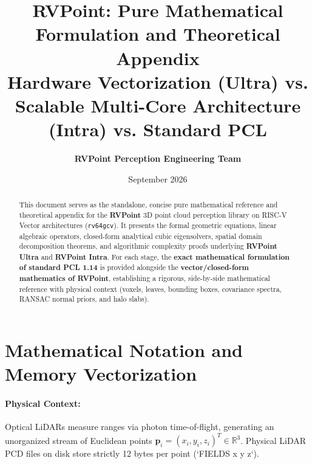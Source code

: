 \documentclass[11pt,a4paper]{article}
\title{\textbf{\LARGE RVPoint: Pure Mathematical Formulation and Theoretical Appendix}\\[0.3em]
\large Hardware Vectorization (Ultra) vs. Scalable Multi-Core Architecture (Intra) vs. Standard PCL}
\author{\textbf{RVPoint Perception Engineering Team}}
\date{September 2026}
\begin{document}
\maketitle

\begin{abstract}
\noindent This document serves as the standalone, concise pure mathematical reference and theoretical appendix for the \textbf{RVPoint} 3D point cloud perception library on RISC-V Vector architectures (\texttt{rv64gcv}). It presents the formal geometric equations, linear algebraic operators, closed-form analytical cubic eigensolvers, spatial domain decomposition theorems, and algorithmic complexity proofs underlying \textbf{RVPoint Ultra} and \textbf{RVPoint Intra}. For each stage, the \textbf{exact mathematical formulation of standard PCL 1.14} is provided alongside the \textbf{vector/closed-form mathematics of RVPoint}, establishing a rigorous, side-by-side mathematical reference with physical context (voxels, leaves, bounding boxes, covariance spectra, RANSAC normal priors, and halo slabs).
\end{abstract}

\tableofcontents
\newpage

\section{Mathematical Notation and Memory Vectorization}
\label{sec:notation}

\paragraph{Physical Context:} Optical LiDARs measure ranges via photon time-of-flight, generating an unorganized stream of Euclidean points $\bm{p}_i = (x_i, y_i, z_i)^T \in \mathbb{R}^3$. Physical LiDAR PCD files on disk store strictly 12 bytes per point (`FIELDS x y z`).
\end{document}
